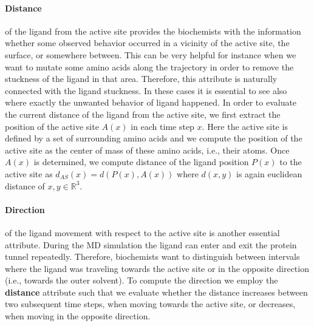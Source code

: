 \documentclass[twocolumn]{bmcart}%
\begin{document}
\paragraph{\textbf{Distance}} of the ligand from the active site provides the biochemists with the information whether some observed behavior occurred in a vicinity of the active site, the surface, or somewhere between. 
This can be very helpful for instance when we want to mutate some amino acids along the trajectory in order to remove the stuckness of the ligand in that area. 
Therefore, this attribute is naturally connected with the ligand stuckness.
In these cases it is essential to see also where exactly the unwanted behavior of ligand happened.
In order to evaluate the current distance of the ligand from the active site, we first extract the position of the active site $A(x)$ in each time step $x$. 
Here the active site is defined by a set of surrounding amino acids and we compute the position of the active site as the center of mass of these amino acids, i.e., their atoms. 
Once $A(x)$ is determined, we compute distance of the ligand position $P(x)$ to the active site as $d_{AS}(x) = d(P(x), A(x))$ where $d(x, y)$ is again euclidean distance of $x, y \in \mathbb{R}^3$.

\paragraph{\textbf{Direction}} of the ligand movement with respect to the active site is another essential attribute. 
During the MD simulation the ligand can enter and exit the protein tunnel repeatedly. 
Therefore, biochemists want to distinguish between intervals where the ligand was traveling towards the active site or in the opposite direction (i.e., towards the outer solvent). 
To compute the direction we employ the \textbf{distance} attribute such that we evaluate whether the distance increases between two subsequent time steps, when moving towards the active site, or decreases, when moving in the opposite direction.
\end{document}
